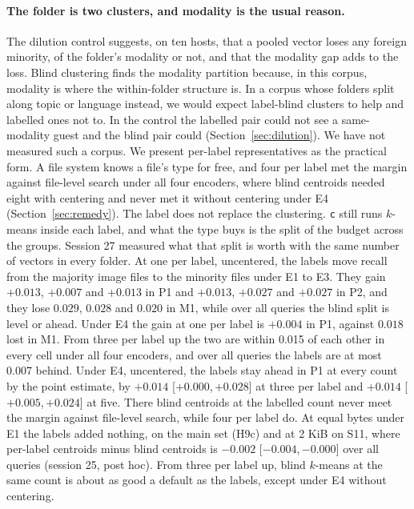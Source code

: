 \documentclass[11pt]{article}
\newcommand{\rep}[1]{\texttt{#1}}
\newcommand{\ci}[2]{[\ensuremath{#1},\,\ensuremath{#2}]}  %
\begin{document}
\paragraph{The folder is two clusters, and modality is the usual reason.} The dilution control suggests, on ten hosts, that a pooled vector loses any foreign minority, of the folder's modality or not, and that the modality gap adds to the loss. Blind clustering finds the modality partition because, in this corpus, modality is where the within-folder structure is. In a corpus whose folders split along topic or language instead, we would expect label-blind clusters to help and labelled ones not to. In the control the labelled pair could not see a same-modality guest and the blind pair could (Section~\ref{sec:dilution}). We have not measured such a corpus. We present per-label representatives as the practical form. A file system knows a file's type for free, and four per label met the margin against file-level search under all four encoders, where blind centroids needed eight with centering and never met it without centering under E4 (Section~\ref{sec:remedy}). The label does not replace the clustering. \rep{c} still runs $k$-means inside each label, and what the type buys is the split of the budget across the groups. Session 27 measured what that split is worth with the same number of vectors in every folder. At one per label, uncentered, the labels move recall from the majority image files to the minority files under E1 to E3. They gain $+0.013$, $+0.007$ and $+0.013$ in P1 and $+0.013$, $+0.027$ and $+0.027$ in P2, and they lose $0.029$, $0.028$ and $0.020$ in M1, while over all queries the blind split is level or ahead. Under E4 the gain at one per label is $+0.004$ in P1, against $0.018$ lost in M1. From three per label up the two are within 0.015 of each other in every cell under all four encoders, and over all queries the labels are at most 0.007 behind. Under E4, uncentered, the labels stay ahead in P1 at every count by the point estimate, by $+0.014$ \ci{+0.000}{+0.028} at three per label and $+0.014$ \ci{+0.005}{+0.024} at five. There blind centroids at the labelled count never meet the margin against file-level search, while four per label do. At equal bytes under E1 the labels added nothing, on the main set (H9c) and at 2 KiB on S11, where per-label centroids minus blind centroids is $-0.002$ \ci{-0.004}{-0.000} over all queries (session 25, post hoc). From three per label up, blind $k$-means at the same count is about as good a default as the labels, except under E4 without centering.
\end{document}
